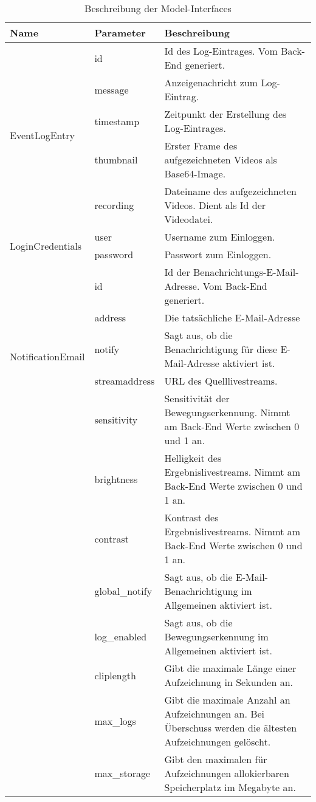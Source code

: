 \begin{table}[]
	\begin{tabular}{|p{}|p{}|p{}|}
		\hline
		
		\cline{1-3}
		\textbf{Name} & \textbf{Parameter} & \textbf{Beschreibung} \\ \hline    
		
		\multirow{5}{*}{EventLogEntry} & id & Id des Log-Eintrages. Vom Back-End generiert. \\ \cline{2-3} 
		& message & Anzeigenachricht zum Log-Eintrag. \\ \cline{2-3} 
		& timestamp & Zeitpunkt der Erstellung des Log-Eintrages. \\ \cline{2-3} 
		& thumbnail & Erster Frame des aufgezeichneten Videos als Base64-Image.\\ \cline{2-3} 
		& recording & Dateiname des aufgezeichneten Videos. Dient als Id der Videodatei. \\ \hline
		
		\multirow{2}{*}{LoginCredentials} & user & Username zum Einloggen. \\ \cline{2-3} 
		& password & Passwort zum Einloggen. \\ \hline
		
		\multirow{5}{*}{NotificationEmail} & id & Id der Benachrichtungs-E-Mail-Adresse. Vom Back-End generiert. \\ \cline{2-3} 
		& address & Die tatsächliche E-Mail-Adresse \\ \cline{2-3}
		& notify & Sagt aus, ob die Benachrichtigung für diese E-Mail-Adresse aktiviert ist. \\ \hline
		
		\multirow{5}{*}{Settings} & streamaddress & \acs{URL} des Quelllivestreams. \\ \cline{2-3} 
		& sensitivity & Sensitivität der Bewegungserkennung. Nimmt am Back-End Werte zwischen 0 und 1 an. \\ \cline{2-3} 
		& brightness & Helligkeit des Ergebnislivestreams. Nimmt am Back-End Werte zwischen 0 und 1 an. \\ \cline{2-3} 
		& contrast & Kontrast des Ergebnislivestreams. Nimmt am Back-End Werte zwischen 0 und 1 an. \\ \cline{2-3} 
		& global\_notify & Sagt aus, ob die E-Mail-Benachrichtigung im Allgemeinen aktiviert ist. \\ \cline{2-3}
		& log\_enabled & Sagt aus, ob die Bewegungserkennung im Allgemeinen aktiviert ist. \\ \cline{2-3}
		& cliplength & Gibt die maximale Länge einer Aufzeichnung in Sekunden an. \\ \cline{2-3}
		& max\_logs & Gibt die maximale Anzahl an Aufzeichnungen an. Bei Überschuss werden die ältesten Aufzeichnungen gelöscht. \\ \cline{2-3}
		& max\_storage & Gibt den maximalen für Aufzeichnungen allokierbaren Speicherplatz im Megabyte an. \\ \hline
		
	\end{tabular}
	\caption{Beschreibung der Model-Interfaces}
	\label{tab:model_interfaces}
\end{table}